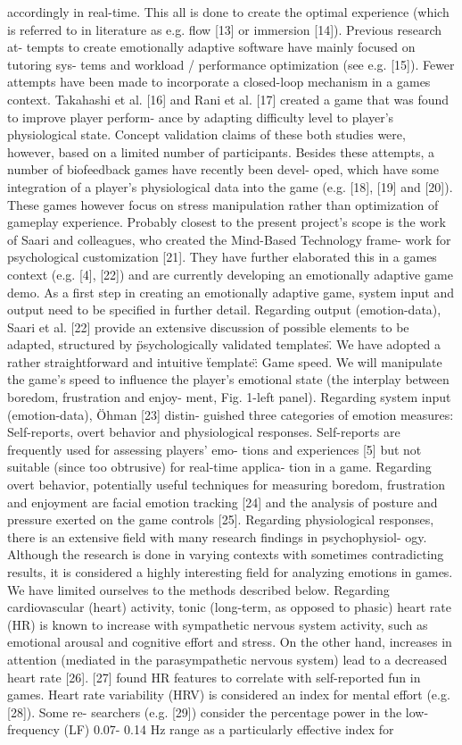 \documentclass{uofsthesis-cs}
\begin{document}
accordingly in real-time. This all is done to create the optimal experience (which is referred to in literature as e.g. flow [13] or immersion [14]). Previous research at- tempts to create emotionally adaptive software have mainly focused on tutoring sys- tems and workload / performance optimization (see e.g. [15]). Fewer attempts have been made to incorporate a closed-loop mechanism in a games context. Takahashi et al. [16] and Rani et al. [17] created a game that was found to improve player perform- ance by adapting difficulty level to player's physiological state. Concept validation claims of these both studies were, however, based on a limited number of participants. Besides these attempts, a number of biofeedback games have recently been devel- oped, which have some integration of a player's physiological data into the game (e.g. [18], [19] and [20]). These games however focus on stress manipulation rather than optimization of gameplay experience. Probably closest to the present project's scope is the work of Saari and colleagues, who created the Mind-Based Technology frame- work for psychological customization [21]. They have further elaborated this in a games context (e.g. [4], [22]) and are currently developing an emotionally adaptive game demo. As a first step in creating an emotionally adaptive game, system input and output need to be specified in further detail. Regarding output (emotion-data), Saari et al. [22] provide an extensive discussion of possible elements to be adapted, structured by \"psychologically validated templates\". We have adopted a rather straightforward and intuitive \"template\": Game speed. We will manipulate the game's speed to influence the player's emotional state (the interplay between boredom, frustration and enjoy- ment, Fig. 1-left panel). Regarding system input (emotion-data), Öhman [23] distin- guished three categories of emotion measures: Self-reports, overt behavior and physiological responses. Self-reports are frequently used for assessing players' emo- tions and experiences [5] but not suitable (since too obtrusive) for real-time applica- tion in a game. Regarding overt behavior, potentially useful techniques for measuring boredom, frustration and enjoyment are facial emotion tracking [24] and the analysis of posture and pressure exerted on the game controls [25]. Regarding physiological responses, there is an extensive field with many research findings in psychophysiol- ogy. Although the research is done in varying contexts with sometimes contradicting results, it is considered a highly interesting field for analyzing emotions in games. We have limited ourselves to the methods described below. Regarding cardiovascular (heart) activity, tonic (long-term, as opposed to phasic) heart rate (HR) is known to increase with sympathetic nervous system activity, such as emotional arousal and cognitive effort and stress. On the other hand, increases in attention (mediated in the parasympathetic nervous system) lead to a decreased heart rate [26]. [27] found HR features to correlate with self-reported fun in games. Heart rate variability (HRV) is considered an index for mental effort (e.g. [28]). Some re- searchers (e.g. [29]) consider the percentage power in the low-frequency (LF) 0.07- 0.14 Hz range as a particularly effective index for 
\end{document}
